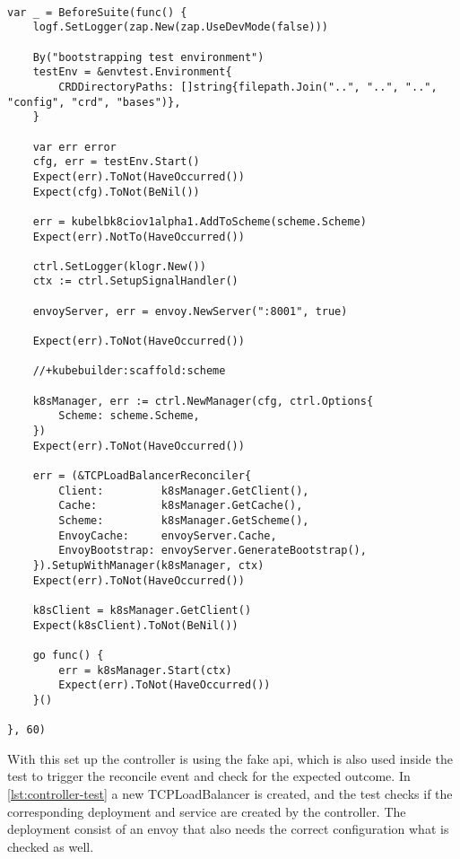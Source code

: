 \begin{lstlisting}[caption={TCPLoadBalancer controller integration test}, label={lst:controller-test-setup}]

var _ = BeforeSuite(func() {
    logf.SetLogger(zap.New(zap.UseDevMode(false)))

    By("bootstrapping test environment")
    testEnv = &envtest.Environment{
        CRDDirectoryPaths: []string{filepath.Join("..", "..", "..", "config", "crd", "bases")},
    }

    var err error
    cfg, err = testEnv.Start()
    Expect(err).ToNot(HaveOccurred())
    Expect(cfg).ToNot(BeNil())

    err = kubelbk8ciov1alpha1.AddToScheme(scheme.Scheme)
    Expect(err).NotTo(HaveOccurred())

    ctrl.SetLogger(klogr.New())
    ctx := ctrl.SetupSignalHandler()

    envoyServer, err = envoy.NewServer(":8001", true)

    Expect(err).ToNot(HaveOccurred())

    //+kubebuilder:scaffold:scheme

    k8sManager, err := ctrl.NewManager(cfg, ctrl.Options{
        Scheme: scheme.Scheme,
    })
    Expect(err).ToNot(HaveOccurred())

    err = (&TCPLoadBalancerReconciler{
        Client:         k8sManager.GetClient(),
        Cache:          k8sManager.GetCache(),
        Scheme:         k8sManager.GetScheme(),
        EnvoyCache:     envoyServer.Cache,
        EnvoyBootstrap: envoyServer.GenerateBootstrap(),
    }).SetupWithManager(k8sManager, ctx)
    Expect(err).ToNot(HaveOccurred())

    k8sClient = k8sManager.GetClient()
    Expect(k8sClient).ToNot(BeNil())

    go func() {
        err = k8sManager.Start(ctx)
        Expect(err).ToNot(HaveOccurred())
    }()

}, 60)
\end{lstlisting}

With this set up the controller is using the fake api, which is also used inside the test to trigger the reconcile event and check for the expected outcome.
In \autoref{lst:controller-test} a new TCPLoadBalancer is created, and the test checks if the corresponding deployment and service are created by the controller.
The deployment consist of an envoy that also needs the correct configuration what is checked as well.

